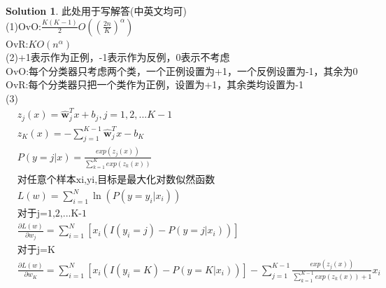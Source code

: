 \documentclass[a4paper,UTF8]{article}
\numberwithin{equation}{section}
\theoremstyle{definition}
\newtheorem*{solution}{Solution}
\def \w {\hat{\boldsymbol{w}}}
\begin{document}
\begin{solution}
	此处用于写解答(中英文均可)
	~\\
	(1)OvO:$\frac{K(K-1)}{2}O((\frac{2n}{K})^{\alpha})$\\
	OvR:$KO(n^{\alpha})$\\
	(2)+1表示作为正例，-1表示作为反例，0表示不考虑\\
	OvO:每个分类器只考虑两个类，一个正例设置为+1，一个反例设置为-1，其余为0\\
	OvR:每个分类器只把一个类作为正例，设置为+1，其余类均设置为-1\\
	(3)\begin{align*}
		&z_j(x)=\w_j^T x+b_j,j=1,2,...K-1\\
		&z_K(x)=-\sum_{j=1}^{K-1} \w_j^T x-b_K\\
		&P(y=j|x)=\frac{exp(z_j(x))}{\sum_{k=1}^{K}exp(z_k(x))}\\
		&\mbox{对任意个样本xi,yi,目标是最大化对数似然函数}\\
		&L(w)=\sum_{i=1}^{N} \ln(P(y=y_i|x_i))\\
		&\mbox{对于j=1,2,...K-1}\\
		&\frac{\partial L(w)}{\partial w_j}=\sum_{i=1}^{N} [x_i (I(y_i=j)-P(y=j|x_i))]\\
		&\mbox{对于j=K}\\
		&\frac{\partial L(w)}{\partial w_K}=\sum_{i=1}^{N} [x_i (I(y_i=K)-P(y=K|x_i))]-\sum_{j=1}^{K-1}\frac{exp(z_j(x))}{\sum_{k=1}^{K-1}exp(z_k(x))+1}x_i\\
	\end{align*}
	~\\
\end{solution}

\newpage
\end{document}
